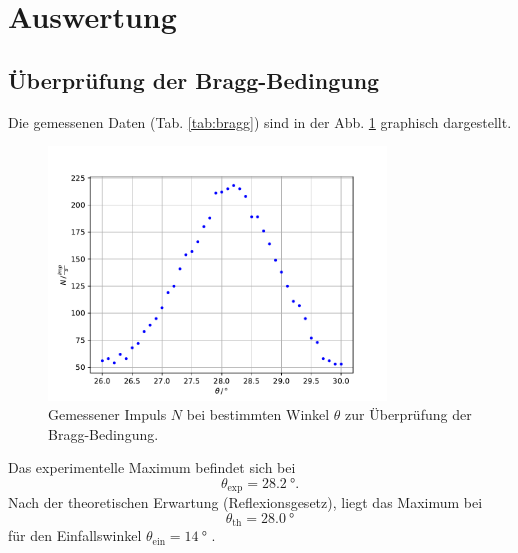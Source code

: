 \section{Auswertung}
\label{sec:Auswertung}

\subsection{Überprüfung der Bragg-Bedingung}
Die gemessenen Daten (Tab. \ref{tab:bragg}) sind in der Abb. \ref{fig:bragg2} graphisch dargestellt.
\begin{figure}
    \centering
    \includegraphics[width=0.8\textwidth]{content/data/bragg.pdf}
    \caption{Gemessener Impuls $N$ bei bestimmten Winkel $\theta$ zur Überprüfung der Bragg-Bedingung. \cite{numpy} \cite{matplotlib}}
    \label{fig:bragg2}
\end{figure}
Das experimentelle Maximum befindet sich bei
\begin{equation*}
    \theta_\text{exp} = \SI{28.2}{\degree} .
\end{equation*}
Nach der theoretischen Erwartung (Reflexionsgesetz), liegt das Maximum bei
\begin{equation*}
    \theta_\text{th} = \SI{28.0}{\degree}
\end{equation*}
für den Einfallswinkel $\theta_\text{ein}=\SI{14}{\degree}$ .

